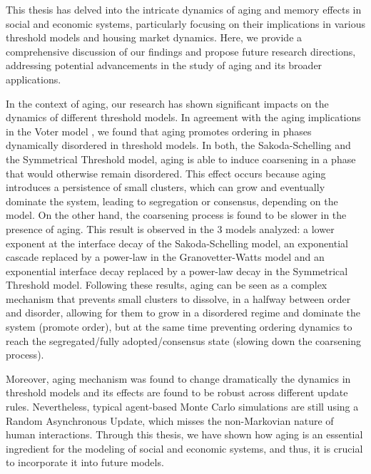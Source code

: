 This thesis has delved into the intricate dynamics of aging and memory effects in social and economic systems, particularly focusing on their implications in various threshold models and housing market dynamics. Here, we provide a comprehensive discussion of our findings and propose future research directions, addressing potential advancements in the study of aging and its broader applications.

In the context of aging, our research has shown significant impacts on the dynamics of different threshold models. In agreement with the aging implications in the Voter model \cite{artime-2018,artime2019herding,peralta-2020C,peralta-2018,peralta-2020A}, we found that aging promotes ordering in phases dynamically disordered in threshold models. In both, the Sakoda-Schelling and the Symmetrical Threshold model, aging is able to induce coarsening in a phase that would otherwise remain disordered. This effect occurs because aging introduces a persistence of small clusters, which can grow and eventually dominate the system, leading to segregation or consensus, depending on the model. On the other hand, the coarsening process is found to be slower in the presence of aging. This result is observed in the 3 models analyzed: a lower exponent at the interface decay of the Sakoda-Schelling model, an exponential cascade replaced by a power-law in the Granovetter-Watts model and an exponential interface decay replaced by a power-law decay in the Symmetrical Threshold model. Following these results, aging can be seen as a complex mechanism that prevents small clusters to dissolve, in a halfway between order and disorder, allowing for them to grow in a disordered regime and dominate the system (promote order), but at the same time preventing ordering dynamics to reach the segregated/fully adopted/consensus state (slowing down the coarsening process). 

Moreover, aging mechanism was found to change dramatically the dynamics in threshold models and its effects are found to be robust across different update rules. Nevertheless, typical agent-based Monte Carlo simulations are still using a Random Asynchronous Update, which misses the non-Markovian nature of human interactions. Through this thesis, we have shown how aging is an essential ingredient for the modeling of social and economic systems, and thus, it is crucial to incorporate it into future models. 


